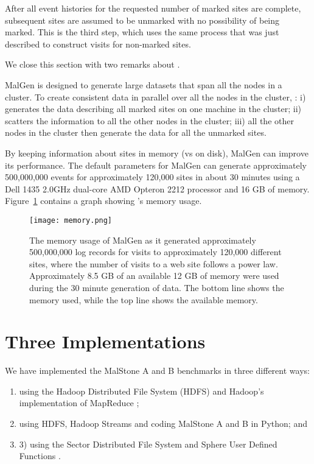 \documentclass{acm_proc_article-sp}
\def\malstone{MalStone } \def\malgen{MalGen }
\begin{document}
After all event histories for the requested number of marked
sites are complete, subsequent sites are assumed to be unmarked
with no possibility of being marked.  This is the third step,
which uses the same process that was just described to construct
visits for non-marked sites.

We close this section with two remarks about \malgenns.

\malgen is designed to generate large datasets that span all the nodes
in a cluster.  To create consistent data in parallel over all the
nodes in the cluster, \malgenns: i) generates the data describing all
marked sites on one machine in the cluster; ii) scatters the
information to all the other nodes in the cluster; iii) all the other
nodes in the cluster then generate the data for all the unmarked
sites.

By keeping information about sites in memory (vs on disk), \malgen can
improve its performance.  The default parameters for \malgen can
generate approximately 500,000,000 events for approximately
120,000 sites in about 30 minutes using a Dell 1435 2.0GHz dual-core
AMD Opteron 2212 processor and 16 GB of memory.
Figure~\ref{figure:memory} contains a graph showing \malgenns's memory
usage.


\begin{figure}
\centering
\texttt{[image: memory.png]}
\caption{The memory usage of \malgen as it generated approximately
500,000,000 log records for visits to approximately 120,000 different
sites, where the number of visits to a web site follows a power law.
Approximately 8.5 GB of an available 12 GB of memory were used during
the 30 minute generation of data.  The bottom line shows the memory used,
while the top line shows the available memory.}
\label{figure:memory}
\end{figure}


\section{Three Implementations}

We have implemented the \malstone A and B benchmarks in three different
ways: 
\begin{enumerate}
\item using the Hadoop Distributed File System (HDFS) \cite{Borthakur:2007}
and Hadoop's implementation of MapReduce \cite{Hadoop:2010}; 
\item using HDFS, Hadoop Streams \cite{Hadoop:2010} and coding \malstone 
A and B in Python; and
\item 3) using the Sector Distributed File System
and Sphere User Defined Functions \cite{Grossman:PTRSA09}.
\end{enumerate}
\end{document}
